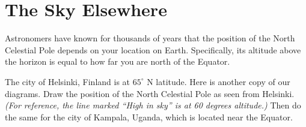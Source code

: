 \documentclass[12pt]{article}
\begin{document}
\section{The Sky Elsewhere}

Astronomers have known for thousands of years that the position of the North Celestial Pole depends on your location on Earth. Specifically, its altitude above the horizon is equal to how far you are north of the Equator.




The city of Helsinki, Finland is at $65^\circ$ N latitude. Here is another copy of our diagrams. Draw the position of the North Celestial Pole as seen from Helsinki. {\it (For reference, the line marked ``High in sky'' is at 60 degrees altitude.)} Then do the same for the city of Kampala, Uganda, which is located near the Equator. 
\end{document}
